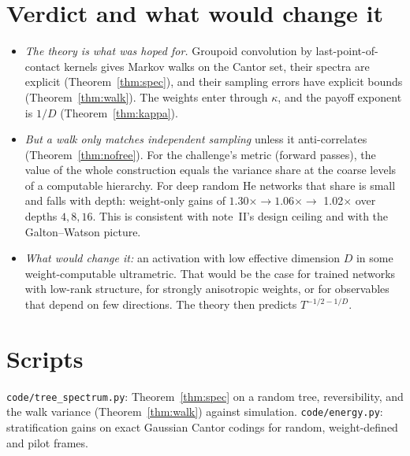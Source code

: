 \documentclass[11pt]{article}
\theoremstyle{definition}
\theoremstyle{remark}
\begin{document}
\section{Verdict and what would change it}
\begin{itemize}
\item \emph{The theory is what was hoped for.} Groupoid convolution by last-point-of-contact kernels gives Markov walks on the Cantor set, their spectra are explicit (Theorem~\ref{thm:spec}), and their sampling errors have explicit bounds (Theorem~\ref{thm:walk}). The weights enter through $\kappa$, and the payoff exponent is $1/D$ (Theorem~\ref{thm:kappa}).
\item \emph{But a walk only matches independent sampling} unless it anti-correlates (Theorem~\ref{thm:nofree}). For the challenge's metric (forward passes), the value of the whole construction equals the variance share at the coarse levels of a computable hierarchy. For deep random He networks that share is small and falls with depth: weight-only gains of $1.30\times\to1.06\times\to$ 1.02$\times$ over depths $4,8,16$. This is consistent with note~II's design ceiling and with the Galton--Watson picture.
\item \emph{What would change it:} an activation with low effective dimension $D$ in some weight-computable ultrametric. That would be the case for trained networks with low-rank structure, for strongly anisotropic weights, or for observables that depend on few directions. The theory then predicts $T^{-1/2-1/D}$.
\end{itemize}

\appendix
\section{Scripts}
\texttt{code/tree\_spectrum.py}: Theorem~\ref{thm:spec} on a random tree, reversibility, and the walk variance (Theorem~\ref{thm:walk}) against simulation. \texttt{code/energy.py}: stratification gains on exact Gaussian Cantor codings for random, weight-defined and pilot frames.
\end{document}
